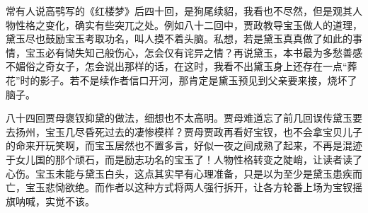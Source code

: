 %
\begin{solution}
    常有人说高鹗写的《红楼梦》后四十回，是狗尾续貂，我看也不尽然，但是观其人物性格之变化，确实有些突兀之处。例如八十二回中，贾政教导宝玉做人的道理，黛玉尽也鼓励宝玉考取功名，叫人摸不着头脑。私想，若是黛玉真真做了如此的事情，宝玉必有恸失知己般伤心，怎会仅有诧异之情？再说黛玉，本书最为多愁善感不媚俗之奇女子，怎会说出那样的话，在这时，我看不出黛玉身上还存在一点“葬花”时的影子。若不是续作者信口开河，那肯定是黛玉预见到父亲要来接，烧坏了脑子。

    八十四回贾母褒钗抑黛的做法，细想也不太高明。贾母难道忘了前几回误传黛玉要去扬州，宝玉几尽昏死过去的凄惨模样？贾母贾政再看好宝钗，也不会拿宝贝儿子的命来开玩笑啊，而宝玉居然也不置多言，好似一夜之间成熟了起来，不再是混迹于女儿国的那个顽石，而是励志功名的宝玉了！人物性格转变之陡峭，让读者读了心伤。宝玉未能与黛玉白头，这点其实早有心理准备，只是以为至少是黛玉患疾而亡，宝玉悲恸欲绝。而作者以这种方式将两人强行拆开，让各方轮番上场为宝钗摇旗呐喊，实觉不该。
\end{solution}


%



%



%


